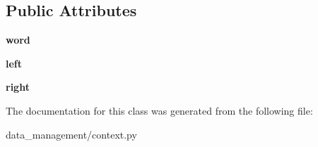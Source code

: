 \subsection*{Public Attributes}
\begin{DoxyCompactItemize}
\item 
\hypertarget{classcontext_1_1Context_a8c912c9591e200226774548b9094b357}{
{\bfseries word}}
\label{classcontext_1_1Context_a8c912c9591e200226774548b9094b357}

\item 
\hypertarget{classcontext_1_1Context_a1eba426903021484e92f1dfc388df1b0}{
{\bfseries left}}
\label{classcontext_1_1Context_a1eba426903021484e92f1dfc388df1b0}

\item 
\hypertarget{classcontext_1_1Context_af51be36ad9fc1d09448873c28a5107a5}{
{\bfseries right}}
\label{classcontext_1_1Context_af51be36ad9fc1d09448873c28a5107a5}

\end{DoxyCompactItemize}


The documentation for this class was generated from the following file:\begin{DoxyCompactItemize}
\item 
data\_\-management/context.py\end{DoxyCompactItemize}
